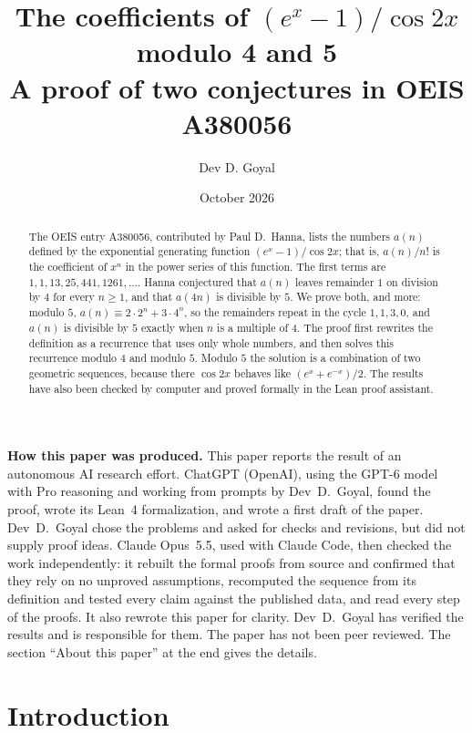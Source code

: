 \documentclass[11pt,a4paper]{article}
\title{The coefficients of $(e^x-1)/\cos 2x$ modulo 4 and 5\\[6pt]\large A proof of two conjectures in OEIS A380056}
\author{Dev D. Goyal}
\date{October 2026}
\theoremstyle{definition}
\theoremstyle{remark}
\begin{document}
\maketitle
\begin{abstract}
The OEIS entry A380056, contributed by Paul D.~Hanna, lists the numbers $a(n)$ defined by the exponential generating
function $(e^x-1)/\cos 2x$; that is, $a(n)/n!$ is the coefficient of $x^n$ in the power series of this function. The
first terms are $1,1,13,25,441,1261,\dots$. Hanna conjectured that $a(n)$ leaves remainder $1$ on division by $4$ for
every $n\ge1$, and that $a(4n)$ is divisible by $5$. We prove both, and more: modulo $5$,
$a(n)\equiv2\cdot2^n+3\cdot4^n$, so the remainders repeat in the cycle $1,1,3,0$, and $a(n)$ is divisible by $5$
exactly when $n$ is a multiple of $4$. The proof first rewrites the definition as a recurrence that uses only whole
numbers, and then solves this recurrence modulo $4$ and modulo $5$. Modulo $5$ the solution is a combination of two
geometric sequences, because there $\cos 2x$ behaves like $(e^x+e^{-x})/2$. The results have also been checked by
computer and proved formally in the Lean proof assistant.
\end{abstract}
\begin{center}\begin{minipage}{0.88\linewidth}\small
\textbf{How this paper was produced.} This paper reports the result of an autonomous AI research effort.
ChatGPT (OpenAI), using the GPT-6 model with Pro reasoning and working from prompts by Dev~D.~Goyal, found the proof, wrote its Lean~4 formalization, and wrote a first draft of the paper.
Dev~D.~Goyal chose the problems and asked for checks and revisions, but did not supply proof ideas.
Claude Opus~5.5, used with Claude Code, then checked the work independently: it rebuilt the formal proofs from
source and confirmed that they rely on no unproved assumptions, recomputed the sequence from its definition and tested
every claim against the published data, and read every step of the proofs. It also rewrote this paper for clarity.
Dev~D.~Goyal has verified the results and is responsible for them. The paper has not been peer reviewed.
The section ``About this paper'' at the end gives the details.
\end{minipage}\end{center}

\section{Introduction}
\end{document}
